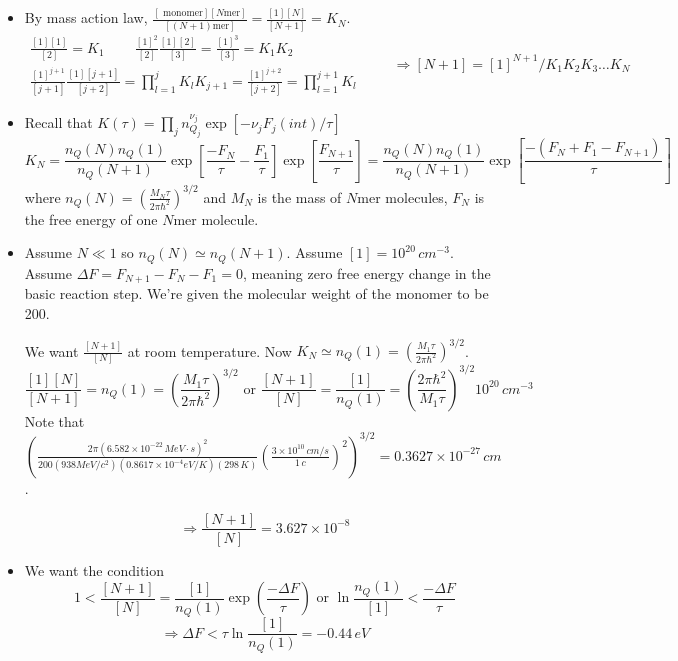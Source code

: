 \begin{itemize}
\item[(a)] By mass action law, $\frac{ [\text{ monomer}][N\text{mer}] }{[(N+1)\text{mer}]} = \frac{ [1][N]}{[N+1]} = K_N$.  
\[
\begin{gathered}
  \frac{[1][1]}{[2]} = K_1 \quad \quad \, \frac{ [1]^2}{[2]}\frac{[1][2]}{[3]} = \frac{[1]^3}{[3]} = K_1 K_2 \\ 
  \frac{ [1]^{j+1} }{[j+1]} \frac{ [1][j+1] }{[j+2]} = \prod^j_{l=1} K_l K_{j+1} = \frac{[1]^{j+2}}{[j+2]} = \prod_{l=1}^{j+1} K_l 
\end{gathered} \quad \quad \, \Longrightarrow \boxed{ [N+1]= [1]^{N+1}/K_1 K_2 K_3 \dots K_N }
\]
\item[(b)] Recall that $K(\tau) = \prod_j n_{Q_j}^{\nu_j} \exp{ [ - \nu_j F_j(int)/\tau ]}$  
\[
K_N = \frac{n_Q(N)n_Q(1)}{ n_Q(N+1)} \exp{ \left[ \frac{-F_N}{\tau} - \frac{F_1}{\tau} \right] }\exp{ \left[ \frac{ F_{N+1}}{\tau} \right] } = \frac{ n_Q(N)n_Q(1) }{n_Q(N+1)} \exp{ \left[ \frac{ - (F_N + F_1 - F_{N+1} )}{\tau} \right]}
\]
where $n_Q(N) = \left( \frac{M_N \tau}{2\pi \hbar^2} \right)^{3/2}$ and $M_N$ is the mass of $N$mer molecules, $F_N$ is the free energy of one $N$mer molecule.  
\item[(c)] Assume $N \ll 1$ so $n_Q(N) \simeq n_Q(N+1)$.  Assume $[1] = 10^{20} \, cm^{-3}$.  Assume $\Delta F = F_{N+1} - F_N - F_1 = 0$, meaning zero free energy change in the basic reaction step.  We're given the molecular weight of the monomer to be 200.  

We want $\frac{[N+1]}{[N]}$ at room temperature.  Now $K_N \simeq n_Q(1) = \left( \frac{ M_1 \tau}{2\pi \hbar^2} \right)^{3/2}$.  
\[
\frac{[1][N]}{[N+1]} = n_Q(1) = \left( \frac{M_1 \tau}{2\pi \hbar^2} \right)^{3/2} \text{ or } \frac{ [N+1]}{[N]} = \frac{[1]}{n_Q(1)} = \left( \frac{2\pi \hbar^2}{M_1 \tau} \right)^{3/2} 10^{20} \, cm^{-3}
\]
Note that $\left( \frac{ 2\pi (6.582 \times 10^{-22} \, MeV \cdot s)^2 }{ 200 (938 MeV/c^2)(0.8617 \times 10^{-4} eV/K)(298 \, K) } \left( \frac{ 3\times 10^{10} \, cm/s}{1 \, c} \right)^2 \right)^{3/2} = 0.3627 \times 10^{-27} \, cm$.  

\[
\Longrightarrow \boxed{ \frac{ [N+1]}{[N]} = 3.627 \times 10^{-8} }
\]
\item[(d)] We want the condition
\[
1 < \frac{ [N+1]}{[N]} = \frac{[1]}{n_Q(1)} \exp{ \left( \frac{ -\Delta F}{\tau} \right) } \text{ or } \ln{ \frac{n_Q(1)}{[1]}} < \frac{ - \Delta F}{\tau} 
\]
\[
\Longrightarrow \Delta F < \tau \ln{  \frac{ [1]}{ n_Q(1)} } = \boxed{ - 0.44 \, eV}
\]
\end{itemize}







